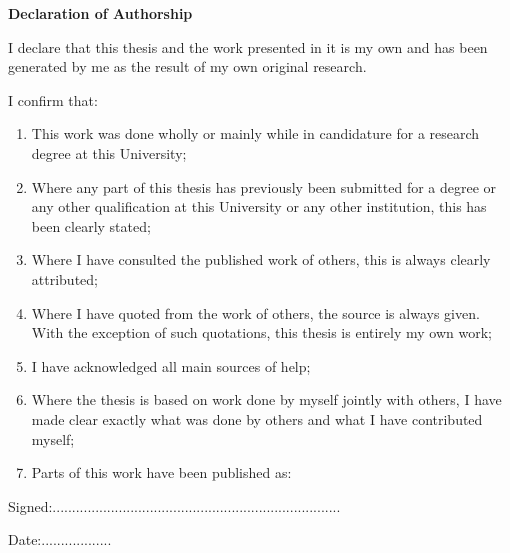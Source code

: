 \vspace*{\fill}
\begin{center}{\Large\bf Declaration of Authorship \par}\end{center}
\vspace{15pt}

\noindent I declare that this thesis and the work presented in it is my own and has
been generated by me as the result of my own original research.

\noindent I confirm that:

\begin{enumerate}
\item This work was done wholly or mainly while in candidature for a research degree at this University;
\item Where any part of this thesis has previously been submitted for a degree or any other qualification at this University or any other institution, this has been clearly stated;
\item Where I have consulted the published work of others, this is always clearly attributed;
\item Where I have quoted from the work of others, the source is always given. With the exception of such quotations, this thesis is entirely my own work;
\item I have acknowledged all main sources of help;
\item Where the thesis is based on work done by myself jointly with others, I have made clear exactly what was done by others and what I have contributed myself;
\item Parts of this work have been published as: 
\end{enumerate}

\vspace{15.0mm}
\begin{minipage}[t]{0.7\textwidth}
  Signed:..........................................................................
\end{minipage}%
\begin{minipage}[t]{0.3\textwidth}
  Date:..................
\end{minipage}

\vfill

\cleardoublepage